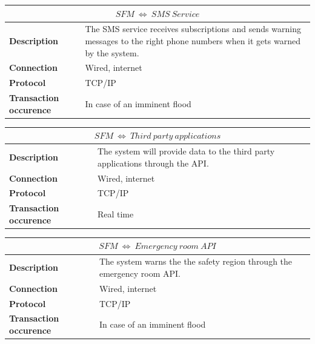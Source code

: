 \begin{table}[!htbp]
	\centering
    \begin{tabular}{L{} L{}}
    \toprule
     \\ \midrule
    \textbf{Description} & The SMS service receives subscriptions and sends warning messages to the right phone numbers when it gets warned by the system. \\
    \textbf{Connection} & Wired, internet \\
    \textbf{Protocol} & TCP/IP \\
    \textbf{Transaction occurence} & In case of an imminent flood \\
    \bottomrule
    \end{tabular}
\end{table}

\begin{table}[!htbp]
	\centering
    \begin{tabular}{L{} L{}}
    \toprule
     \\ \midrule
    \textbf{Description} & The system will provide data to the third party applications through the API.\\
    \textbf{Connection} & Wired, internet \\
    \textbf{Protocol} & TCP/IP \\
    \textbf{Transaction occurence} & Real time \\
    \bottomrule
    \end{tabular}
\end{table}

\begin{table}[!htbp]
	\centering
    \begin{tabular}{L{} L{}}
    \toprule
     \\ \midrule
    \textbf{Description} & The system warns the the safety region through the emergency room API. \\
    \textbf{Connection} & Wired, internet \\
    \textbf{Protocol} & TCP/IP \\
    \textbf{Transaction occurence} & In case of an imminent flood \\
    \bottomrule
    \end{tabular}
\end{table}



